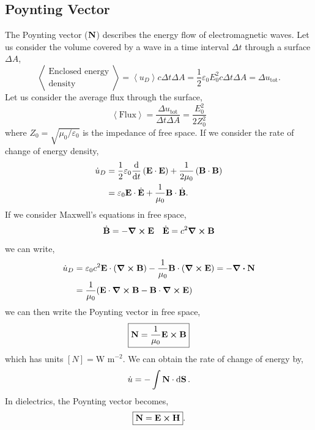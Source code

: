 \documentclass{book}
\begin{document}
\subsection{Poynting Vector}
The Poynting vector ($\vb{N}$) describes the energy flow of electromagnetic waves. Let us consider the volume covered by a wave in a time interval $\Delta t$ through a surface $\Delta A$,
\begin{equation}
	\left<\substack{\text{Enclosed energy}\\\text{density}}\right> = \left<u_D\right> c\Delta t \Delta A = \frac{1}{2}\varepsilon_0E_0^2c\Delta t \Delta A = \Delta u_{\text{tot}}.
\end{equation}
Let us consider the average flux through the surface,
\begin{equation}
	\left<\text{Flux}\right> = \frac{\Delta u_{\text{tot}}}{\Delta t \Delta A} = \frac{E_0^2}{2Z_0^2}
\end{equation}
where $Z_0 = \sqrt{\mu_0/\varepsilon_0}$ is the impedance of free space. If we consider the rate of change of energy density,
\begin{equation}
	\begin{split}
	\Dot{u}_D & = \frac{1}{2}\varepsilon_0\dv{t}\left(\vb{E}\cdot \vb{E}\right) + \frac{1}{2\mu_0}\left(\vb{B}\cdot\vb{B}\right) \\
	& = \varepsilon_0 \vb{E}\cdot \Dot{\vb{E}} + \frac{1}{\mu_0}\vb{B}\cdot\Dot{\vb{B}}.
	\end{split}
\end{equation}
If we consider Maxwell's equations in free space,
\begin{align}
	\Dot{\vb{B}} = - \curl{\vb{E}} && \Dot{\vb{E}} = c^2 \curl{\vb{B}}
\end{align}
we can write,
\begin{equation}
	\begin{split}
		\Dot{u}_D & = \varepsilon_0 c^2\vb{E}\cdot(\curl{\vb{B}}) - \frac{1}{\mu_0}\vb{B}\cdot(\curl{\vb{E}}) = - \div{\vb{N}} \\
		& = \frac{1}{\mu_0}(\vb{E}\cdot{\curl{\vb{B}}} - \vb{B}\cdot{\curl{\vb{E}}})
	\end{split}
\end{equation}
we can then write the Poynting vector in free space,
\begin{equation}
	\boxed{\vb{N} = \frac{1}{\mu_0}\vb{E}\cross\vb{B}}
\end{equation}
which has units $\left[N\right] = \text{W m}^{-2}$.
We can obtain the rate of change of energy by,
\begin{equation}
	\Dot{u} = - \int\vb{N}\cdot\dd{\vb{S}}.
\end{equation}
In dielectrics, the Poynting vector becomes,
\begin{equation}
	\boxed{\vb{N} = \vb{E}\cross\vb{H}}.
\end{equation}
\end{document}
